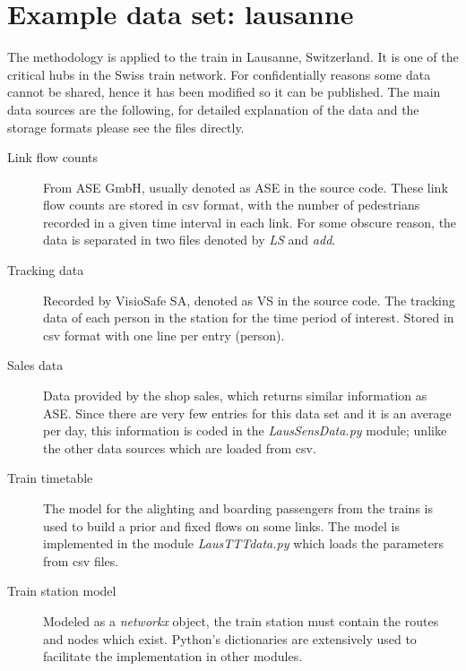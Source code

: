 \documentclass[a4paper,12pt]{article}
\begin{document}
\section{Example data set: lausanne}
The methodology is applied to the train in Lausanne, Switzerland. It is one of the critical hubs in the Swiss train network. For confidentially reasons some data cannot be shared, hence it has been modified so it can be published. The main data sources are the following, for detailed explanation of the data and the storage formats please see the files directly.
\begin{description}
\item[Link flow counts] From ASE GmbH, usually denoted as ASE in the source code. These link flow counts are stored in csv format, with the number of pedestrians recorded in a given time interval in each link. For some obscure reason, the data is separated in two files denoted by \textit{LS} and \textit{add}.
\item[Tracking data] Recorded by VisioSafe SA, denoted as VS in the source code. The tracking data of each person in the station for the time period of interest. Stored in csv format with one line per entry (person).
\item[Sales data] Data provided by the shop sales, which returns similar information as ASE. Since there are very few entries for this data set and it is an average per day, this information is coded in the \textit{LausSensData.py} module; unlike the other data sources which are loaded from csv.
\item[Train timetable] The model for the alighting and boarding passengers from the trains is used to build a prior and fixed flows on some links. The model is implemented in the module \textit{LausTTTdata.py} which loads the parameters from csv files.
\item[Train station model] Modeled as a \textit{networkx} object, the train station must contain the routes and nodes which exist. Python's dictionaries are extensively used to facilitate the implementation in other modules.
\end{description}
\end{document}
